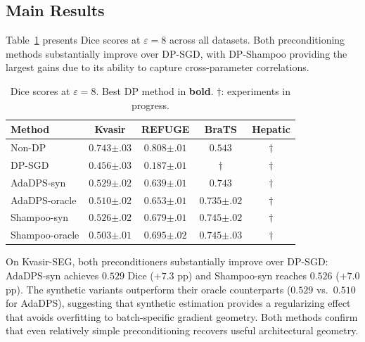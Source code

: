 \documentclass[runningheads]{llncs}
\begin{document}
\subsection{Main Results}
\label{subsec:main_results}

Table~\ref{tab:main} presents Dice scores at $\varepsilon{=}8$ across all datasets. Both preconditioning methods substantially improve over DP-SGD, with DP-Shampoo providing the largest gains due to its ability to capture cross-parameter correlations.

\begin{table}[t]
\centering
\caption{Dice scores at $\varepsilon{=}8$. Best DP method in \textbf{bold}. $\dagger$: experiments in progress.}\label{tab:main}
\renewcommand{\arraystretch}{1.15}
\small
\begin{tabular}{lcccc}
\toprule
\textbf{Method} & \textbf{Kvasir} & \textbf{REFUGE} & \textbf{BraTS} & \textbf{Hepatic} \\
\midrule
Non-DP & $0.743{\scriptstyle\pm.03}$ & $0.808{\scriptstyle\pm.01}$ & $0.543$ & $\dagger$ \\
\midrule
DP-SGD & $0.456{\scriptstyle\pm.03}$ & $0.187{\scriptstyle\pm.01}$ & $\dagger$ & $\dagger$ \\
AdaDPS-syn & $\mathbf{0.529}{\scriptstyle\pm.02}$ & $0.639{\scriptstyle\pm.01}$ & $0.743$ & $\dagger$ \\
AdaDPS-oracle & $0.510{\scriptstyle\pm.02}$ & $0.653{\scriptstyle\pm.01}$ & $0.735{\scriptstyle\pm.02}$ & $\dagger$ \\
Shampoo-syn & $0.526{\scriptstyle\pm.02}$ & $0.679{\scriptstyle\pm.01}$ & $\mathbf{0.745}{\scriptstyle\pm.02}$ & $\dagger$ \\
Shampoo-oracle & $0.503{\scriptstyle\pm.01}$ & $\mathbf{0.695}{\scriptstyle\pm.02}$ & $0.745{\scriptstyle\pm.03}$ & $\dagger$ \\
\bottomrule
\end{tabular}
\end{table}

On Kvasir-SEG, both preconditioners substantially improve over DP-SGD: AdaDPS-syn achieves $0.529$ Dice ($+7.3$ pp) and Shampoo-syn reaches $0.526$ ($+7.0$ pp). The synthetic variants outperform their oracle counterparts ($0.529$ vs.\ $0.510$ for AdaDPS), suggesting that synthetic estimation provides a regularizing effect that avoids overfitting to batch-specific gradient geometry. Both methods confirm that even relatively simple preconditioning recovers useful architectural geometry.
\end{document}
